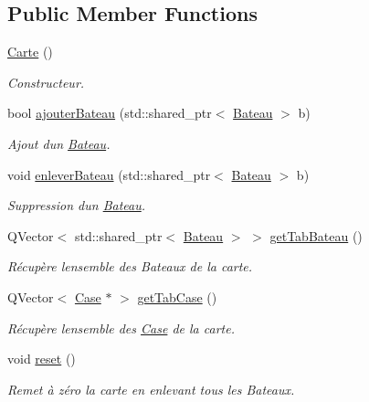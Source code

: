 \subsection*{Public Member Functions}
\begin{DoxyCompactItemize}
\item 
\hyperlink{class_carte_a06daaca86c31c80f8308f4a81d46dc9b}{Carte} ()
\begin{DoxyCompactList}\small\item\em Constructeur. \end{DoxyCompactList}\item 
bool \hyperlink{class_carte_a8415ea8b3274e0fddecc122d83ce80a9}{ajouter\+Bateau} (std\+::shared\+\_\+ptr$<$ \hyperlink{class_bateau}{Bateau} $>$ b)
\begin{DoxyCompactList}\small\item\em Ajout d\textquotesingle{}un \hyperlink{class_bateau}{Bateau}. \end{DoxyCompactList}\item 
void \hyperlink{class_carte_ae4966ed5306a6f85453b556830935026}{enlever\+Bateau} (std\+::shared\+\_\+ptr$<$ \hyperlink{class_bateau}{Bateau} $>$ b)
\begin{DoxyCompactList}\small\item\em Suppression d\textquotesingle{}un \hyperlink{class_bateau}{Bateau}. \end{DoxyCompactList}\item 
Q\+Vector$<$ std\+::shared\+\_\+ptr$<$ \hyperlink{class_bateau}{Bateau} $>$ $>$ \hyperlink{class_carte_ac05b028a316243ba5e66d4bfab48f6fa}{get\+Tab\+Bateau} ()
\begin{DoxyCompactList}\small\item\em Récupère l\textquotesingle{}ensemble des Bateaux de la carte. \end{DoxyCompactList}\item 
Q\+Vector$<$ \hyperlink{class_case}{Case} $\ast$ $>$ \hyperlink{class_carte_a6974f6c1fb5884205ba7b45f6ef7c89c}{get\+Tab\+Case} ()
\begin{DoxyCompactList}\small\item\em Récupère l\textquotesingle{}ensemble des \hyperlink{class_case}{Case} de la carte. \end{DoxyCompactList}\item 
void \hyperlink{class_carte_a108f801be6118ec28cf29102a68b4e9f}{reset} ()
\begin{DoxyCompactList}\small\item\em Remet à zéro la carte en enlevant tous les Bateaux. \end{DoxyCompactList}\end{DoxyCompactItemize}
